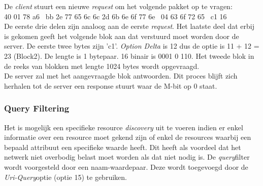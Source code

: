 \noindent
De \textit{client} stuurt een nieuwe \textit{request} om het volgende pakket op te vragen:\\
40 01 78 a6 \textbar~bb 2e 77 65 6c 6c 2d 6b 6e 6f 77 6e \textbar~04 63 6f 72 65 \textbar~c1 16\\
De eerste drie delen zijn analoog aan de eerste \textit{request}. Het laatste deel dat erbij is gekomen geeft het volgende blok aan dat verstuurd moet worden door de server. De eerste twee bytes zijn 'c1'. \textit{Option Delta} is 12 dus de optie is 11 + 12 = 23 (Block2). De lengte is 1 bytepaar. 16 binair is 0001 0 110. Het tweede blok in de reeks van blokken met lengte 1024 bytes wordt opgevraagd.\\

\noindent
De server zal met het aangevraagde blok antwoorden. Dit proces blijft zich herhalen tot de server een response stuurt waar de M-bit op 0 staat.

\subsubsection{Query Filtering}
Het is mogelijk een specifieke resource \textit{discovery} uit te voeren indien er enkel informatie over een resource moet gekend zijn of enkel de resources waarbij een bepaald attribuut een specifieke waarde heeft. Dit heeft als voordeel dat het netwerk niet overbodig belast moet worden als dat niet nodig is. De \textit{query}filter wordt voorgesteld door een naam-waardepaar. Deze wordt toegevoegd door de \textit{Uri-Query}optie (optie 15) te gebruiken.

